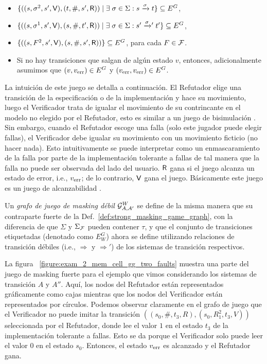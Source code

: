 \begin{definition}
\begin{itemize}
  \item $\{ ((s, \sigma^2, s', \mathsf{V}), (t, \#, s', \mathsf{R})) \mid \exists\;\sigma \in \Sigma: s \xrightarrow{\sigma} t \} \subseteq E^G$,

  \item $\{ ((s, \sigma^1, s', \mathsf{V}), (s, \#, t', \mathsf{R})) \mid \exists\;\sigma \in \Sigma: s' \mathrel{{\xrightarrow[]{\sigma}}{}'} t' \} \subseteq E^G$,

  \item $\{ ((s, F^2, s', \mathsf{V}), (s, \#, s', \mathsf{R})) \} \subseteq E^G$, para cada $F \in \mathcal{F}$. 

  \item Si no hay transiciones que salgan de algún estado $v$, entonces, adicionalmente asumimos que $(v, v_{\text{err}}) \in E^G$ y $(v_{\text{err}}, v_{\text{err}}) \in E^G$.
\end{itemize}

\end{definition}

La intuición de este juego se detalla a continuación. 
El Refutador elige una transición de la especificación o de la implementación y hace su movimiento, luego el Verificador trata de igualar el movimiento de su contrincante en el modelo no elegido por el Refutador, esto es similar a un juego de bisimulación \cite{Stirling99}. 
Sin embargo, cuando el Refutador escoge una falla (solo este jugador puede elegir fallas), el Verificador debe igualar su movimiento con un movimiento ficticio (no hacer nada).
Esto intuitivamente se puede interpretar como un enmascaramiento de la falla por parte de la implementación tolerante a fallas de tal manera que la falla no puede ser observada del lado del usuario. $\mathsf{R}$ gana si el juego alcanza un estado de error, i.e., $v_{\text{err}}$; de lo contrario, $\mathsf{V}$ gana el juego. 
Básicamente este juego es un juego de alcanzabilidad \cite{Jurd11}.

Un \emph{grafo de juego de masking débil} $\mathcal{G}^W_{A,A'}$ se define de la misma manera que su contraparte fuerte de la 
Def.~\ref{def:strong_masking_game_graph}, con la diferencia de que
$\Sigma$ y $\Sigma_{\mathcal{F}}$ pueden contener $\tau$, y que el conjunto de transiciones etiquetadas (denotado como $E_W^G$) ahora se define utilizando relaciones de transición débiles (i.e., $\Rightarrow$ y $\Rightarrow'$) de los sistemas de transición respectivos.

La figura ~\ref{figure:exam_2_mem_cell_gg_two_faults} muestra una parte del juego de masking fuerte para el ejemplo que vimos considerando los sistemas de transición $A$ y $A''$. Aquí, los nodos del Refutador están representados gráficamente como cajas mientras que los nodos del Verificador están representados por círculos.
Podemos observar claramente en el grafo de juego que el Verificador no puede imitar la transición $((s_0, \#, t_3, R),(s_0, R_1^2, t_3, V))$
seleccionada por el Refutador, donde lee el valor $1$ en el estado $t_3$ de la implementación tolerante a fallas. Esto se da porque el Verificador solo puede leer el valor $0$ en el estado $s_0$. 
Entonces, el estado $v_{\text{err}}$ es alcanzado y el Refutador gana.

